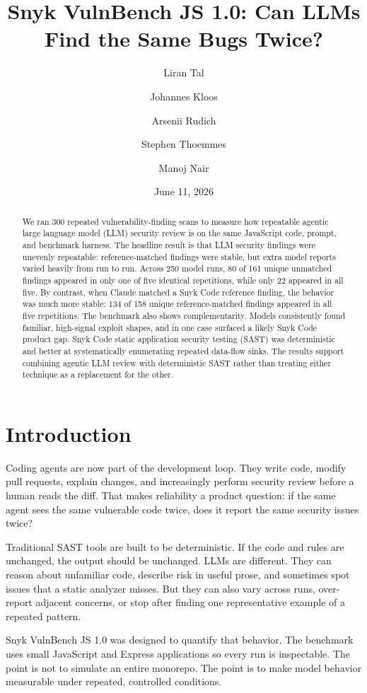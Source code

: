\documentclass[11pt]{article}
\title{Snyk VulnBench JS 1.0: Can LLMs Find the Same Bugs Twice?}
\author[1]{Liran Tal}
\author[1]{Johannes Kloos}
\author[1]{Arsenii Rudich}
\author[1]{Stephen Thoemmes}
\author[1]{Manoj Nair}
\affil[1]{Snyk}
\date{June 11, 2026}
\begin{document}
\maketitle

\begin{abstract}
We ran 300 repeated vulnerability-finding scans to measure how repeatable agentic large language model (LLM) security review is on the same JavaScript code, prompt, and benchmark harness. The headline result is that LLM security findings were unevenly repeatable: reference-matched findings were stable, but extra model reports varied heavily from run to run. Across 250 model runs, 80 of 161 unique unmatched findings appeared in only one of five identical repetitions, while only 22 appeared in all five. By contrast, when Claude matched a Snyk Code reference finding, the behavior was much more stable: 134 of 158 unique reference-matched findings appeared in all five repetitions. The benchmark also shows complementarity. Models consistently found familiar, high-signal exploit shapes, and in one case surfaced a likely Snyk Code product gap. Snyk Code static application security testing (SAST) was deterministic and better at systematically enumerating repeated data-flow sinks. The results support combining agentic LLM review with deterministic SAST rather than treating either technique as a replacement for the other.
\end{abstract}

\section{Introduction}

Coding agents are now part of the development loop. They write code, modify pull requests, explain changes, and increasingly perform security review before a human reads the diff. That makes reliability a product question: if the same agent sees the same vulnerable code twice, does it report the same security issues twice?

Traditional SAST tools are built to be deterministic. If the code and rules are unchanged, the output should be unchanged. LLMs are different. They can reason about unfamiliar code, describe risk in useful prose, and sometimes spot issues that a static analyzer misses. But they can also vary across runs, over-report adjacent concerns, or stop after finding one representative example of a repeated pattern.

Snyk VulnBench JS 1.0 was designed to quantify that behavior. The benchmark uses small JavaScript and Express applications so every run is inspectable. The point is not to simulate an entire monorepo. The point is to make model behavior measurable under repeated, controlled conditions.
\end{document}
